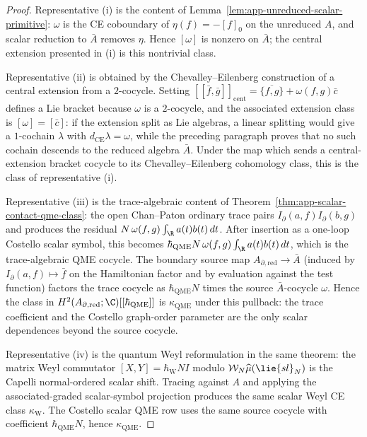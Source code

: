 \begin{proof}
  Representative (i) is the content of
  Lemma~\ref{lem:app-unreduced-scalar-primitive}: \(\omega\) is the
  CE coboundary of \(\eta(f)=-[f]_0\) on the unreduced \(A\), and
  scalar reduction to \(\bar A\) removes \(\eta\).  Hence \([\omega]\) is
  nonzero on \(\bar A\); the central extension presented in (i) is
  this nontrivial class.

  Representative (ii) is obtained by the Chevalley--Eilenberg
  construction of a central extension from a \(2\)-cocycle.  Setting
  \([\![\bar f,\bar g]\!]_{\mathrm{cent}}=\overline{\{f,g\}}+\omega(f,g)\bar c\)
  defines a Lie bracket because \(\omega\) is a \(2\)-cocycle, and the
  associated extension class is \([\omega]=[\bar c]\): if the extension
  split as Lie algebras, a linear splitting would give a \(1\)-cochain
  \(\lambda\) with \(d_{\mathrm{CE}}\lambda=\omega\), while the preceding
  paragraph proves that no such cochain descends to the reduced algebra
  \(\bar A\).  Under the map which sends a central-extension bracket
  cocycle to its Chevalley--Eilenberg cohomology class, this is the
  class of representative (i).

  Representative (iii) is the trace-algebraic content of
  Theorem~\ref{thm:app-scalar-contact-qme-class}: the open Chan--Paton
  ordinary trace pairs \(I_\partial(a,f)I_\partial(b,g)\) and produces
  the residual \(N\,\omega(f,g)\int_\R a(t)b(t)\,dt\).  After insertion
  as a one-loop Costello scalar symbol, this becomes
  \(\hbar_{\mathrm{QME}}N\,\omega(f,g)\int_\R a(t)b(t)\,dt\), which is
  the trace-algebraic QME cocycle.  The boundary
  source map \(A_{\partial,\mathrm{red}}\to\bar A\) (induced by
  \(I_\partial(a,f)\mapsto\bar f\) on the Hamiltonian factor and by
  evaluation against the test function) factors the trace cocycle as
  \(\hbar_{\mathrm{QME}}N\) times the source \(\bar A\)-cocycle \(\omega\).
  Hence the class in
  \(H^2(A_{\partial,\mathrm{red}};\C)[[\hbar_{\mathrm{QME}}]]\) is
  \(\kappa_{\mathrm{QME}}\) under this pullback: the trace
  coefficient and the Costello graph-order parameter are the only
  scalar dependences beyond the source cocycle.

  Representative (iv) is the quantum Weyl reformulation in the same theorem:
  the matrix Weyl commutator \([X,Y]=\hbar_{\mathrm{W}}N I\) modulo
  \(\mathcal W_N\widehat\mu(\lie{sl}_N)\) is the Capelli normal-ordered
  scalar shift.  Tracing against \(A\) and applying the
  associated-graded scalar-symbol projection produces the same scalar
  Weyl CE class \(\kappa_{\mathrm{W}}\).  The Costello scalar QME row
  uses the same source cocycle with coefficient
  \(\hbar_{\mathrm{QME}}N\), hence \(\kappa_{\mathrm{QME}}\).


\end{proof}
